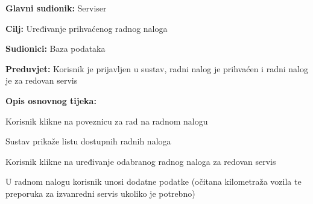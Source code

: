 \noindent {}
\begin{packed_item}
	
	\item \textbf{Glavni sudionik: } Serviser
	\item  \textbf{Cilj:} Uređivanje prihvaćenog radnog naloga
	\item  \textbf{Sudionici:} Baza podataka
	\item  \textbf{Preduvjet:} Korisnik je prijavljen u sustav, radni nalog je
	prihvaćen i radni nalog je za redovan servis
	\item  \textbf{Opis osnovnog tijeka:}
	
	\item[] \begin{packed_enum}
		
		\item Korisnik klikne na poveznicu za rad na radnom nalogu
		\item Sustav prikaže listu dostupnih radnih naloga
		\item Korisnik klikne na uređivanje odabranog radnog naloga za redovan
		servis
		\item U radnom nalogu korisnik unosi dodatne podatke (očitana kilometraža
		vozila te preporuka za izvanredni servis ukoliko je potrebno)
		
	\end{packed_enum}
\end{packed_item}



